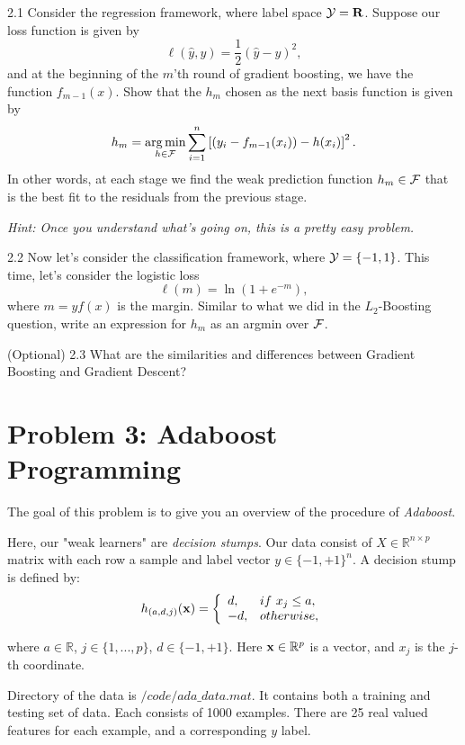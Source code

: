 \documentclass{article}
\theoremstyle{definition}
\theoremstyle{definition}
\theoremstyle{remark}
\DeclareMathOperator*{\argmin}{arg\,min}
\begin{document}
2.1 Consider the regression framework, where label space $\mathcal{Y}=\mathbf{R}$. Suppose our
loss function is given by 
\[
\ell(\hat{y},y)=\frac{1}{2}\left(\hat{y}-y\right)^{2},
\]
and at the beginning of the $m$'th round of gradient boosting, we
have the function $f_{m-1}(x)$. Show that the $h_{m}$ chosen as
the next basis function is given by 
\[
h_{m}=\argmin_{h\in\cf}\sum_{i=1}^{n}\left[\left(y_{i}-f_{m-1}(x_{i})\right)-h(x_{i})\right]^{2}.
\]
In other words, at each stage we find the weak prediction function
$h_{m}\in\mathcal{F}$ that is the best fit to the residuals from the previous
stage. 

\emph{Hint: Once you understand what's going on, this is a pretty
easy problem.}

2.2 Now let's consider the classification framework, where $\mathcal{Y}=\left\{ -1,1\right\} $. This time, let's consider the logistic loss 
\[
\ell(m)=\ln\left(1+e^{-m}\right),
\]
where $m=yf(x)$ is the margin. Similar to what we did in the $L_{2}$-Boosting
question, write an expression for $h_{m}$ as an argmin over $\mathcal{F}$. 

(Optional) 2.3 What are the similarities and differences between Gradient Boosting and Gradient Descent?


\section*{Problem 3: Adaboost Programming}\label{problem:3}

The goal of this problem is to give you an overview of the procedure of \emph{Adaboost}.

Here, our "weak learners" are \emph{decision stumps}. Our data consist of $X \in \mathbb{R}^{n\times p}$ matrix with each row a sample and label vector $y\in\{-1, +1\}^{n}$. A decision stump is defined by:
\begin{displaymath}
h_{(a,d,j)}(\bold{x})= \left\{\begin{array}{ll}
d, & if\ x_{j}\leq a, \\
-d, & otherwise,
\end{array} \right.
\end{displaymath}

where $a\in \mathbb{R}$, $j\in \{1, ..., p\}$, $d\in \{-1, +1\}$. Here $\bold{x}\in \mathbb{R}^{p}$ is a vector, and $x_{j}$ is the $j$-th coordinate.

Directory of the data is \emph{$/code/ada\_data.mat$}. It contains both a training and testing set of data. Each consists of 1000 examples. There are 25 real valued features for each example, and a corresponding $y$ label.
\end{document}

